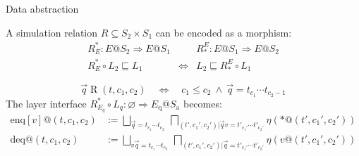 \documentclass[aspectratio=141]{beamer}
\newcommand{\kw}[1]{\ensuremath{ \mathrm{#1} }}
\begin{document}
\begin{frame}{Data abstraction} %
  \begin{definition}
    A simulation relation $R \subseteq S_2 \times S_1$
    can be encoded as a morphism:
    \[
      \begin{array}{ccc}
        R^*_E : E@S_2 \Rightarrow E@S_1 & &
        R_*^E : E@S_1 \Rightarrow E@S_2 \\[1ex]
        R^*_E \circ L_2 \sqsubseteq L_1 &
        \Leftrightarrow &
        L_2 \sqsubseteq R_*^E \circ L_1
      \end{array}
    \]
  \end{definition}
  \pause
  \begin{example}
    \[
      \vec{q} \mathrel{R} (t, c_1, c_2)
      \quad \Leftrightarrow \quad
      c_1 \le c_2 \:\wedge\:
      \vec{q} = t_{c_1} \cdots t_{c_2 - 1}
    \]
    The layer interface
    $R^*_{E_q} \circ L_q : \varnothing \Rightarrow E_\kw{q}@S_\kw{a}$
    becomes:
    \begin{align*}
      \kw{enq}[v]@(t, c_1, c_2) &:=
        \bigsqcup_{\vec{q} = t_{c_1}\cdots t_{c_2}} \:
        \bigsqcap_{(t', c_1', c_2') | \vec{q}v = t'_{c_1'} \cdots t'_{c_2'}}
        \eta(*@(t', c_1', c_2')) \\
      \kw{deq}@(t, c_1, c_2) &:=
        \bigsqcup_{v\vec{q} = t_{c_1}\cdots t_{c_2}} \:
        \bigsqcap_{(t', c_1', c_2') | \vec{q} = t'_{c_1'} \cdots t'_{c_2'}}
        \eta(v@(t', c_1', c_2'))
    \end{align*}
  \end{example}
\end{frame}
\end{document}

